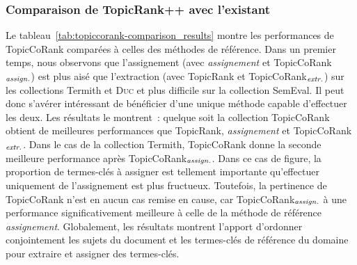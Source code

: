       \subsubsection{Comparaison de TopicRank++ avec l'existant}
      \label{subsubsec:main-automatic_keyphrase_annotation-supervised_automatic_keyphrase_annotation-evaluation-comparison}
        Le tableau~\ref{tab:topiccorank-comparison_results} montre les
        performances de TopicCoRank comparées à celles des méthodes de
        référence. Dans un premier temps, nous observons que l'assignement (avec
        \textit{assignement} et TopicCoRank$_\textnormal{\textit{assign.}}$) est
        plus aisé que l'extraction (avec TopicRank et
        TopicCoRank$_\textnormal{\textit{extr.}}$) sur les collections Termith
        et \textsc{Duc} et plus difficile sur la collection SemEval.  Il peut donc s'avérer
        intéressant de bénéficier d'une unique méthode capable d'effectuer les
        deux. Les résultats le montrent~: quelque soit la collection TopicCoRank
        obtient de meilleures performances que TopicRank, \textit{assignement}
        et TopicCoRank$_\textnormal{\textit{extr.}}$. Dans le cas de la
        collection Termith, TopicCoRank donne la seconde meilleure performance
        après TopicCoRank$_\textnormal{\textit{assign.}}$. Dans ce cas de
        figure, la proportion de termes-clés \og{}à assigner\fg{} est tellement
        importante qu'effectuer uniquement de l'assignement est plus fructueux.
        Toutefois, la pertinence de TopicCoRank n'est en aucun cas remise en
        cause, car TopicCoRank$_\textnormal{\textit{assign.}}$ à une performance
        significativement meilleure à celle de la méthode de référence
        \textit{assignement}. Globalement, les résultats montrent l'apport
        d'ordonner conjointement les sujets du document et les termes-clés de
        référence du domaine pour extraire et assigner des termes-clés.
